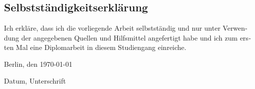 \begin{otherlanguage}{ngerman}
\chapter{Selbstständigkeitserklärung}
Ich erkläre, dass ich die vorliegende Arbeit selbstständig und nur unter Verwendung der angegebenen Quellen und Hilfsmittel angefertigt habe und ich zum ersten Mal eine Diplomarbeit in diesem Studiengang einreiche.

Berlin, den \today
\begin{flushright}
Datum, Unterschrift
\end{flushright}
\end{otherlanguage}